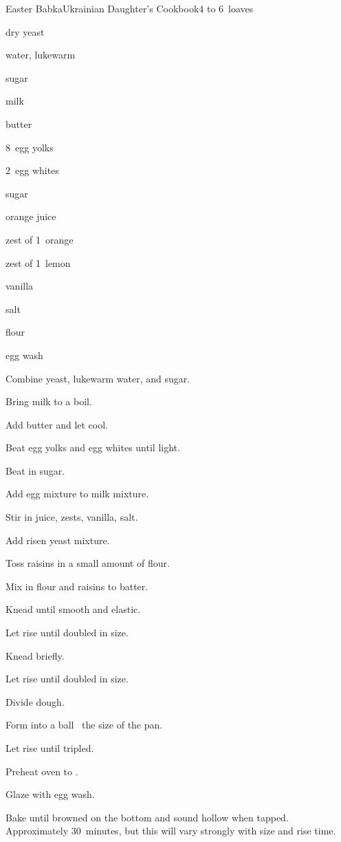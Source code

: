 \begin{recipe}{Easter Babka}{Ukrainian Daughter's Cookbook}{4 to 6~loaves}

\begin{ingredients}
\item {} dry yeast
\item \C{\third} water, lukewarm
\item {} sugar
\item {} milk
\item \C{\half} butter
\item 8~egg yolks
\item 2~egg whites
\item {} sugar
\item \C{\half} orange juice
\item zest of 1~orange
\item zest of 1~lemon
\item {} vanilla
\item {} salt
\item {} flour
\item \C{\half} 
\item egg wash
\end{ingredients}

\begin{directions}
\item Combine yeast, lukewarm water, and  sugar.
\item Bring milk to a boil.
\item Add butter and let cool.
\item Beat egg yolks and egg whites until light.
\item Beat in sugar.
\item Add egg mixture to milk mixture.
\item Stir in juice, zests, vanilla, salt.
\item Add risen yeast mixture.
\item Toss raisins in a small amount of flour.
\item Mix in flour and raisins to batter.
\item Knead until smooth and elastic.
\item Let rise until doubled in size.
\item Knead briefly.
\item Let rise until doubled in size.
\item Divide dough.
\item Form into a ball \third~the size of the pan.
\item Let rise until tripled.
\item Preheat oven to .
\item Glaze with egg wash.
\item Bake until browned on the bottom and sound hollow when tapped. Approximately 30~minutes, but this will vary strongly with size and rise time.
\end{directions}

\end{recipe}
